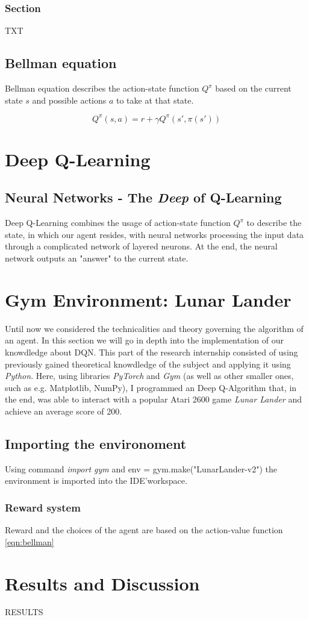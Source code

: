 \documentclass{article}
\begin{document}
\subsubsection{Section}
TXT

\subsection{Bellman equation}
Bellman equation describes the action-state function $Q^\pi$ based on the current state $s$ and possible actions $a$ to take at that state.

\begin{equation}
\label{eqn:bellman}
Q^\pi(s,a) = r+\gamma Q^\pi(s',\pi(s'))
\end{equation}

\section{Deep Q-Learning}
\subsection{Neural Networks - The \textit{Deep} of Q-Learning}
Deep Q-Learning combines the usage of action-state function $Q^\pi$ to describe the state, in which our agent resides, with neural networks processing the input data through a complicated network of layered neurons. At the end, the neural network outputs an "answer" to the current state.

\section{Gym Environment: Lunar Lander}
Until now we considered the technicalities and theory governing the algorithm of an agent. In this section we will go in depth into the implementation of our knowdledge about DQN. This part of the research internship consisted of using previously gained theoretical knowdledge of the subject and applying it using \textit{Python}. Here, using libraries \textit{PyTorch} and \textit{Gym} (as well as other smaller ones, such as e.g. Matplotlib, NumPy), I programmed an Deep Q-Algorithm that, in the end, was able to interact with a popular Atari 2600 game \textit{Lunar Lander} and achieve an average score of 200.

\subsection{Importing the environoment}
Using command \textit{import gym} and env = gym.make("LunarLander-v2") the environment is imported into the IDE'\footnotemark \space workspace.

\subsubsection{Reward system}
Reward and the choices of the agent are based on the action-value function \ref{eqn:bellman}

\newpage
\section*{Results and Discussion}
RESULTS
\end{document}
